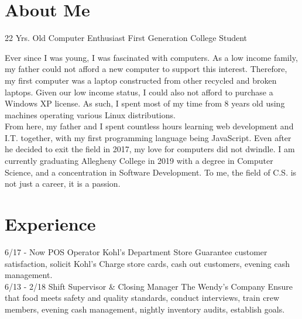 \documentclass[]{friggeri-cv}
\begin{document}
\section{About Me}
\begin{entrylist}
	\entry
	{22 Yrs. Old}
	{Computer Enthusiast}
	{First Generation College Student}
	{Ever since I was young, I was fascinated with computers. As a low income family, my father could not afford a new computer to support this interest.  Therefore, my first computer was a laptop constructed from other recycled and broken laptops.  Given our low income status, I could also not afford to purchase a Windows XP license. As such, I spent most of my time from 8 years old using machines operating various Linux distributions.\\
	
	From here, my father and I spent countless hours learning web development and I.T. together, with my first programming language being JavaScript.  Even after he decided to exit the field in 2017, my love for computers did not dwindle.  I am currently graduating Allegheny College in 2019 with a degree in Computer Science, and a concentration in Software Development.  To me, the field of C.S. is not just a career, it is a passion.

}
\end{entrylist}

\section{Experience}
\begin{entrylist}
  \entry
    {6/17 - Now}
    {POS Operator}
    {Kohl's Department Store}
    {Guarantee customer satisfaction, solicit Kohl's Charge store cards, cash out customers, evening cash management.\\}
  \entry
    {6/13 - 2/18}
    {Shift Supervisor \& Closing Manager}
    {The Wendy's Company}
    {Ensure that food meets safety and quality standards, conduct interviews, train crew members, evening cash management, nightly inventory audits, establish goals.\\}
\end{entrylist}
\end{document}
